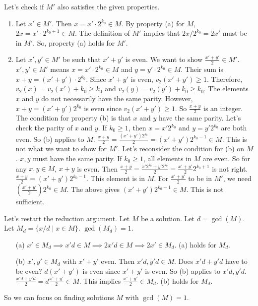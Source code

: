 \documentclass[12pt,a4paper]{article}
\theoremstyle{definition}
\begin{document}
    Let's check if $M'$ also satisfies the given properties.
    \begin{enumerate}
        \item Let $x' \in M'$. Then $x = x' \cdot 2^{k_0} \in M$. By property (a) for $M$, $2x = x' \cdot 2^{k_0+1} \in M$.
        The definition of $M'$ implies that $2x / 2^{k_0} = 2x'$ must be in $M'$. So, property (a) holds for $M'$.

        \item Let $x', y' \in M'$ be such that $x'+y'$ is even. We want to show $\frac{x'+y'}{2} \in M'$.
        $x', y' \in M'$ means $x = x' \cdot 2^{k_0} \in M$ and $y = y' \cdot 2^{k_0} \in M$.
        Their sum is $x+y = (x'+y') \cdot 2^{k_0}$. Since $x'+y'$ is even, $v_2(x'+y') \geq 1$.
        Therefore, $v_2(x) = v_2(x') + k_0 \geq k_0$ and $v_2(y) = v_2(y') + k_0 \geq k_0$.
        The elements $x$ and $y$ do not necessarily have the same parity.
        However, $x+y = (x'+y')2^{k_0}$ is even since $v_2(x'+y') \geq 1$. So $\frac{x+y}{2}$ is an integer.
        The condition for property (b) is that $x$ and $y$ have the same parity.
        Let's check the parity of $x$ and $y$.
        If $k_0 \geq 1$, then $x=x'2^{k_0}$ and $y=y'2^{k_0}$ are both even. So (b) applies to $M$.
        $\frac{x+y}{2} = \frac{(x'+y')2^{k_0}}{2} = (x'+y')2^{k_0-1} \in M$.
        This is not what we want to show for $M'$.
        Let's reconsider the condition for (b) on $M$. $x,y$ must have the same parity.
        If $k_0 \geq 1$, all elements in $M$ are even. So for any $x,y \in M$, $x+y$ is even.
        Then $\frac{x+y}{2} = \frac{x'2^{k_0}+y'2^{k_0}}{2} = \frac{x'+y'}{2} 2^{k_0+1}$ is not right.
        $\frac{x+y}{2} = (x'+y')2^{k_0-1}$. This element is in $M$.
        For $\frac{x'+y'}{2}$ to be in $M'$, we need $\left(\frac{x'+y'}{2}\right) 2^{k_0} \in M$.
        The above gives $(x'+y')2^{k_0-1} \in M$. This is not sufficient.
    \end{enumerate}

    Let's restart the reduction argument.
    Let $M$ be a solution. Let $d = \gcd(M)$. Let $M_d = \{x/d \mid x \in M\}$. $\gcd(M_d)=1$.
    \begin{enumerate}
        \item[(a)] $x' \in M_d \implies x'd \in M \implies 2x'd \in M \implies 2x' \in M_d$. (a) holds for $M_d$.
        \item[(b)] $x', y' \in M_d$ with $x'+y'$ even. Then $x'd, y'd \in M$.
        Does $x'd+y'd$ have to be even? $d(x'+y')$ is even since $x'+y'$ is even.
        So (b) applies to $x'd, y'd$. $\frac{x'd+y'd}{2} = d\frac{x'+y'}{2} \in M$.
        This implies $\frac{x'+y'}{2} \in M_d$. (b) holds for $M_d$.
    \end{enumerate}
    So we can focus on finding solutions $M$ with $\gcd(M)=1$.
\end{document}
